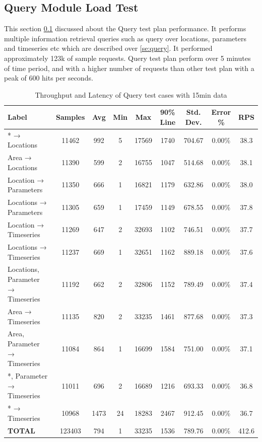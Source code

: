 \subsection{Query Module Load Test}
\label{subse:obs_test_plan_query_15min}
This section \ref{subse:obs_test_plan_query_15min} discussed about the Query test plan performance. It performs multiple information retrieval queries such as query over locations, parameters and timeseries etc which are described over \ref{se:query}. It performed approximately 123k of sample requests.
Query test plan perform over 5 minutes of time period, and with a higher number of requests than other test plan with a peak of 600 hits per seconds.

\begin{table}[ht]
\footnotesize
\begin{tabulary}{\linewidth}{|L|C|C|C|C|C|C|C|C|}
\hline
Label & Samples & Avg & Min & Max & 90\% Line & Std. Dev. & Error \% & RPS \\ \hline
* → Locations & 11462 & 992 & 5 & 17569 & 1740 & 704.67 & 0.00\% & 38.3 \\ \hline
Area → Locations & 11390 & 599 & 2 & 16755 & 1047 & 514.68 & 0.00\% & 38.1 \\ \hline
Location → Parameters & 11350 & 666 & 1 & 16821 & 1179 & 632.86 & 0.00\% & 38.0 \\ \hline
Locations → Parameters & 11305 & 659 & 1 & 17459 & 1149 & 678.55 & 0.00\% & 37.8 \\ \hline
Location → Timeseries & 11269 & 647 & 2 & 32693 & 1102 & 746.51 & 0.00\% & 37.7 \\ \hline
Locations → Timeseries & 11237 & 669 & 1 & 32651 & 1162 & 889.18 & 0.00\% & 37.6 \\ \hline
Locations, Parameter → Timeseries & 11192 & 662 & 2 & 32806 & 1152 & 789.49 & 0.00\% & 37.4 \\ \hline
Area → Timeseries & 11135 & 820 & 2 & 33235 & 1461 & 877.68 & 0.00\% & 37.3 \\ \hline
Area, Parameter → Timeseries & 11084 & 864 & 1 & 16699 & 1584 & 751.00 & 0.00\% & 37.1 \\ \hline
*, Parameter → Timeseries & 11011 & 696 & 2 & 16689 & 1216 & 693.33 & 0.00\% & 36.8 \\ \hline
* → Timeseries & 10968 & 1473 & 24 & 18283 & 2467 & 912.45 & 0.00\% & 36.7 \\ \hline
\textbf{TOTAL} & 123403 & 794 & 1 & 33235 & 1536 & 789.76 & 0.00\% & 412.6 \\ \hline
\end{tabulary}
\caption{Throughput and Latency of Query test cases with 15min data}
\label{tab:obs_query_15_min_summary}
\end{table}
